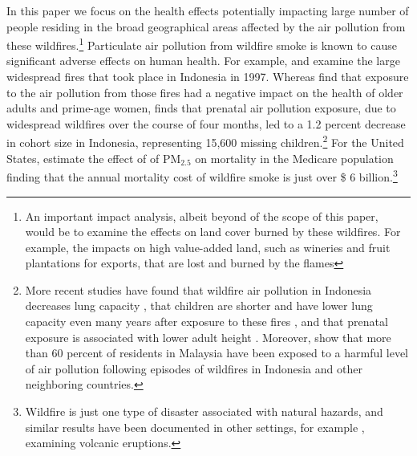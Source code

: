 \documentclass[11pt]{article}
\begin{document}
\begin{spacing}{1.3}

In this paper we focus on the health effects potentially impacting large number of people residing in the broad geographical areas affected by the air pollution from these wildfires.\footnote{An important impact analysis, albeit beyond of the scope of this paper, would be to examine the effects on land cover burned by these wildfires. For example, the impacts on high value-added land, such as wineries and fruit plantations for exports, that are lost and burned by the flames} Particulate air pollution from wildfire smoke is known to cause significant adverse effects on human health. For example, \cite{frankenberg2005health} and \cite{jayachandran2009air} examine the large widespread fires that took place in Indonesia in 1997. Whereas \cite{frankenberg2005health} find that exposure to the air pollution from those fires had a negative  impact on the health of older adults and prime-age women, \cite{jayachandran2009air} finds that prenatal air pollution exposure, due to widespread wildfires over the course of four months, led to a 1.2 percent decrease in cohort size in Indonesia, representing 15,600 missing children.\footnote{More recent studies have found that wildfire air pollution in Indonesia decreases lung capacity \citep{Pakhtigian2020where}, that children are shorter and have lower lung capacity even many years after exposure to these fires \citep{rosales2019persistent}, and that prenatal exposure is associated with lower adult height \citep{tan2019seeking}. Moreover, \cite{mead2018impact} show that more than 60 percent of residents in Malaysia have been exposed to a harmful level of air pollution following episodes of wildfires in Indonesia and other neighboring countries.} For the United States, \cite{miller2017blowing}  estimate the effect of of PM$_{2.5}$ on mortality in the Medicare population finding that the annual mortality cost of wildfire smoke is just over \$ 6 billion.\footnote{Wildfire is just one type of disaster associated with natural hazards, and similar results have been documented in other settings, for example \citet{halliday2019vog}, examining volcanic eruptions.} 


\end{spacing}
\end{document}
